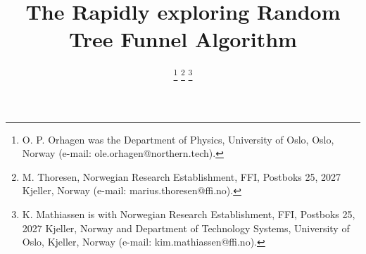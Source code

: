 \documentclass{IEEEtran}
\newcommand{\0}{\mathbf{0}}
\newcommand{\1}{\mathbf{1}}
\begin{document}
\title{The Rapidly exploring Random Tree Funnel Algorithm}

\author{

 \thanks{O. P. Orhagen was the Department of Physics,
    University of Oslo, Oslo, Norway (e-mail: ole.orhagen@northern.tech). }
 \thanks{M. Thoresen, Norwegian Research Establishment, FFI,
    Postboks 25, 2027 Kjeller, Norway (e-mail: marius.thoresen@ffi.no).}
 \thanks{K. Mathiassen is with 
 Norwegian Research Establishment, FFI,
    Postboks 25, 2027 Kjeller, Norway and Department of Technology Systems, University of Oslo, Kjeller, Norway (e-mail: kim.mathiassen@ffi.no).}}

\maketitle
\end{document}
